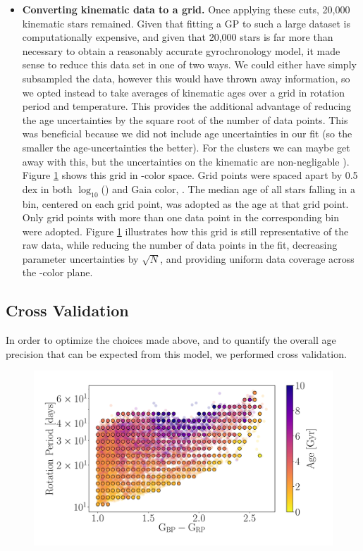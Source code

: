 \begin{itemize}
\item {\bf Converting kinematic data to a grid.}
Once applying these cuts, 20,000 kinematic stars remained.
        Given that fitting a GP to such a large dataset is computationally
        expensive, and given that 20,000 stars is far more than necessary to
        obtain a reasonably accurate gyrochronology model, it made sense to
        reduce this data set in one of two ways.
        We could either have simply subsampled the data, however this would
        have thrown away
        information, so we opted instead to take averages of kinematic ages
        over a grid in rotation period and temperature.
This provides the additional advantage of reducing the age uncertainties by
        the square root of the number of data points.
        This was beneficial because we did not include age uncertainties in
        our fit (so the smaller the age-uncertainties the better).
For the clusters we can maybe get away with this, but the uncertainties on the
kinematic are non-negligable \citep[likely 1-2 Gyr][]{lu2021}).
Figure \ref{fig:grid_points} shows this grid in \prot-color space.
        Grid points were spaced apart by 0.5 dex in both $\log_{10}$(\prot)
        and Gaia color, \gcolor.
The median age of all stars falling in a bin, centered on each grid point, was
adopted as the age at that grid point.
Only grid points with more than one data point in the corresponding bin were
adopted.
Figure \ref{fig:grid_points} illustrates how this grid is still representative
of the raw data, while reducing the number of data points in the fit,
decreasing parameter uncertainties by $\sqrt N$, and providing uniform data
coverage across the \prot-color plane.
\end{itemize}

\subsection{Cross Validation}
In order to optimize the choices made above, and to quantify the overall age
precision that can be expected from this model, we performed cross validation.


\begin{figure}
\caption{
}
  \centering \includegraphics[width=1\textwidth]{grid_points}
    \label{fig:grid_points}
\end{figure}

